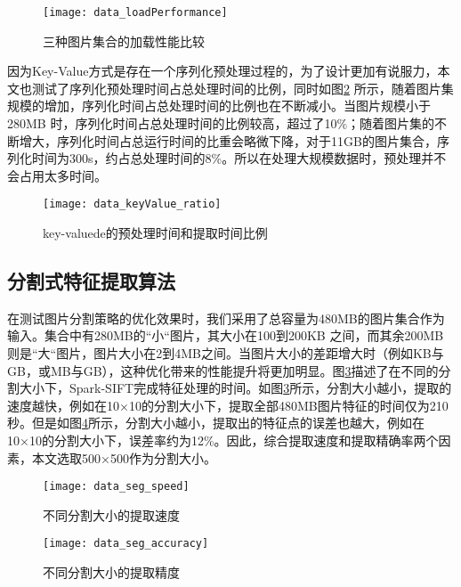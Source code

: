 \begin{figure}[htp]
\centering
\texttt{[image: data\_loadPerformance]}
\caption{三种图片集合的加载性能比较}
\label{fig:data_loadPerformance}
\end{figure}
因为Key-Value方式是存在一个序列化预处理过程的，为了设计更加有说服力，本文也测试了序列化预处理时间占总处理时间的比例，同时如图\ref{fig:data_keyValue_ratio} 所示，随着图片集规模的增加，序列化时间占总处理时间的比例也在不断减小。当图片规模小于280MB 时，序列化时间占总处理时间的比例较高，超过了10\%；随着图片集的不断增大，序列化时间占总运行时间的比重会略微下降，对于11GB的图片集合，序列化时间为300s，约占总处理时间的8\%。所以在处理大规模数据时，预处理并不会占用太多时间。
\begin{figure}[htp]
\centering
\texttt{[image: data\_keyValue\_ratio]}
\caption{key-valuede的预处理时间和提取时间比例}
\label{fig:data_keyValue_ratio}
\end{figure}

\subsection{分割式特征提取算法}
在测试图片分割策略的优化效果时，我们采用了总容量为480MB的图片集合作为输入。集合中有280MB的``小``图片，其大小在100到200KB 之间，而其余200MB则是``大``图片，图片大小在2到4MB之间。当图片大小的差距增大时（例如KB与GB，或MB与GB），这种优化带来的性能提升将更加明显。图\ref{fig:data_seg_speed}描述了在不同的分割大小下，Spark-SIFT完成特征处理的时间。如图\ref{fig:data_seg_speed}所示，分割大小越小，提取的速度越快，例如在10×10的分割大小下，提取全部480MB图片特征的时间仅为210秒。但是如图\ref{fig:data_seg_accuracy}所示，分割大小越小，提取出的特征点的误差也越大，例如在10×10的分割大小下，误差率约为12\%。因此，综合提取速度和提取精确率两个因素，本文选取500×500作为分割大小。
\begin{figure}[htp]
\centering
\texttt{[image: data\_seg\_speed]}
\caption{不同分割大小的提取速度}
\label{fig:data_seg_speed}
\end{figure}

\begin{figure}[htp]
\centering
\texttt{[image: data\_seg\_accuracy]}
\caption{不同分割大小的提取精度}
\label{fig:data_seg_accuracy}
\end{figure}

